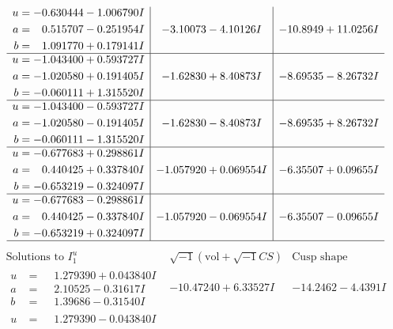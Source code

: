 \documentclass[1p]{elsarticle_modified}
\theoremstyle{definition}
\newcommand{\I}{\sqrt{-1}}
\begin{document}
$$\begin{array}{c|c|c}
\begin{aligned}
u &= -0.630444 - 1.006790 I \\
a &= \phantom{-}0.515707 - 0.251954 I \\
b &= \phantom{-}1.091770 + 0.179141 I\end{aligned}
 & -3.10073 - 4.10126 I & -10.8949 + 11.0256 I \\ \hline\begin{aligned}
u &= -1.043400 + 0.593727 I \\
a &= -1.020580 + 0.191405 I \\
b &= -0.060111 + 1.315520 I\end{aligned}
 & -1.62830 + 8.40873 I & -8.69535 - 8.26732 I \\ \hline\begin{aligned}
u &= -1.043400 - 0.593727 I \\
a &= -1.020580 - 0.191405 I \\
b &= -0.060111 - 1.315520 I\end{aligned}
 & -1.62830 - 8.40873 I & -8.69535 + 8.26732 I \\ \hline\begin{aligned}
u &= -0.677683 + 0.298861 I \\
a &= \phantom{-}0.440425 + 0.337840 I \\
b &= -0.653219 - 0.324097 I\end{aligned}
 & -1.057920 + 0.069554 I & -6.35507 + 0.09655 I \\ \hline\begin{aligned}
u &= -0.677683 - 0.298861 I \\
a &= \phantom{-}0.440425 - 0.337840 I \\
b &= -0.653219 + 0.324097 I\end{aligned}
 & -1.057920 - 0.069554 I & -6.35507 - 0.09655 I\\
 \hline 
 \end{array}$$\newpage$$\begin{array}{c|c|c}  
\text{Solutions to }I^u_{1}& \I (\text{vol} + \sqrt{-1}CS) & \text{Cusp shape}\\
 \hline 
\begin{aligned}
u &= \phantom{-}1.279390 + 0.043840 I \\
a &= \phantom{-}2.10525 - 0.31617 I \\
b &= \phantom{-}1.39686 - 0.31540 I\end{aligned}
 & -10.47240 + 6.33527 I & -14.2462 - 4.4391 I \\ \hline\begin{aligned}
u &= \phantom{-}1.279390 - 0.043840 I \\

\end{aligned}
\end{array}$$
\end{document}

